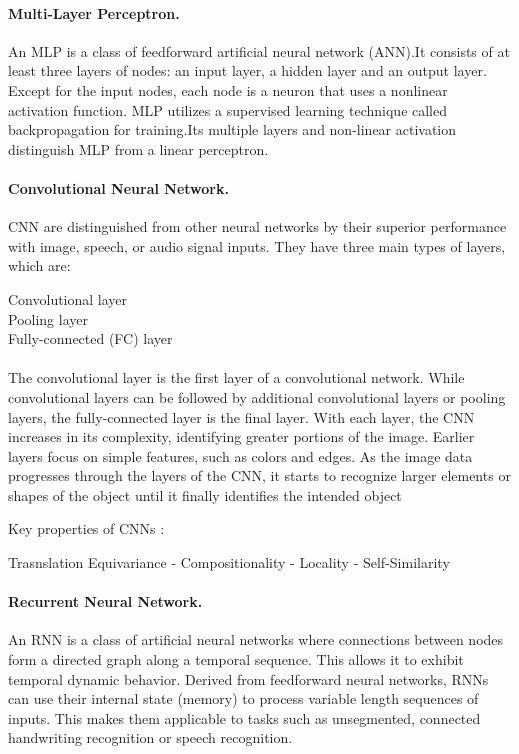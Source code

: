 \documentclass{article}
\begin{document}
\paragraph*{Multi-Layer Perceptron.}An MLP is a class of feedforward artificial neural network (ANN).It consists of at least three layers of nodes: an input layer, a hidden layer and an output layer. Except for the input nodes, each node is a neuron that uses a nonlinear activation function. MLP utilizes a supervised learning technique called backpropagation for training.Its multiple layers and non-linear activation distinguish MLP from a linear perceptron.

\paragraph*{Convolutional Neural Network.}
CNN are distinguished from other neural networks by their superior performance with image, speech, or audio signal inputs. They have three main types of layers, which are:

Convolutional layer \\
Pooling layer \\
Fully-connected (FC) layer \\ \\
The convolutional layer is the first layer of a convolutional network. While convolutional layers can be followed by additional convolutional layers or pooling layers, the fully-connected layer is the final layer. With each layer, the CNN increases in its complexity, identifying greater portions of the image. Earlier layers focus on simple features, such as colors and edges. As the image data progresses through the layers of the CNN, it starts to recognize larger elements or shapes of the object until it finally identifies the intended object

Key properties of CNNs :

Trasnslation Equivariance - Compositionality - Locality - Self-Similarity

\paragraph*{Recurrent Neural Network.}
An RNN is a class of artificial neural networks where connections between nodes form a directed graph along a temporal sequence. This allows it to exhibit temporal dynamic behavior. Derived from feedforward neural networks, RNNs can use their internal state (memory) to process variable length sequences of inputs. This makes them applicable to tasks such as unsegmented, connected handwriting recognition or speech recognition.
\end{document}
